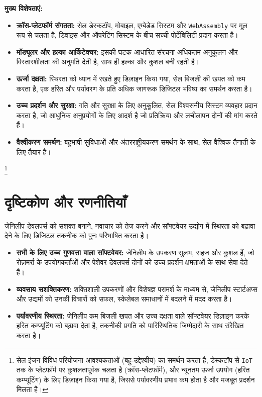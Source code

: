 \documentclass[a4paper,12pt,openany]{book}
\begin{document}
\textbf{मुख्य विशेषताएं:}
\begin{itemize}
    \item \textbf{क्रॉस-प्लेटफॉर्म संगतता:} सेल डेस्कटॉप, मोबाइल, एम्बेडेड सिस्टम और \texttt{WebAssembly} पर मूल रूप से चलता है, डिवाइस और ऑपरेटिंग सिस्टम के बीच सच्ची पोर्टेबिलिटी प्रदान करता है।
    \item \textbf{मॉड्यूलर और हल्का आर्किटेक्चर:} इसकी घटक-आधारित संरचना अधिकतम अनुकूलन और विस्तारशीलता की अनुमति देती है, साथ ही हल्का और कुशल बनी रहती है।
    \item \textbf{ऊर्जा दक्षता:} स्थिरता को ध्यान में रखते हुए डिज़ाइन किया गया, सेल बिजली की खपत को कम करता है, एक हरित और पर्यावरण के प्रति अधिक जागरूक डिजिटल भविष्य का समर्थन करता है।
    \item \textbf{उच्च प्रदर्शन और सुरक्षा:} गति और सुरक्षा के लिए अनुकूलित, सेल विश्वसनीय सिस्टम व्यवहार प्रदान करता है, जो आधुनिक अनुप्रयोगों के लिए आदर्श है जो प्रतिक्रिया और लचीलापन दोनों की मांग करते हैं।
    \item \textbf{वैश्वीकरण समर्थन:} बहुभाषी सुविधाओं और अंतरराष्ट्रीयकरण समर्थन के साथ, सेल वैश्विक तैनाती के लिए तैयार है।
\end{itemize}

\footnote{सेल इंजन विविध परियोजना आवश्यकताओं (बहु-उद्देश्यीय) का समर्थन करता है, डेस्कटॉप से \texttt{IoT} तक के प्लेटफॉर्म पर कुशलतापूर्वक चलता है (क्रॉस-प्लेटफॉर्म), और न्यूनतम ऊर्जा उपयोग (हरित कम्प्यूटिंग) के लिए डिज़ाइन किया गया है, जिससे पर्यावरणीय प्रभाव कम होता है और मजबूत प्रदर्शन मिलता है।}

\chapter{दृष्टिकोण और रणनीतियाँ}

जेनिलीप डेवलपर्स को सशक्त बनाने, नवाचार को तेज करने और सॉफ्टवेयर उद्योग में स्थिरता को बढ़ावा देने के लिए डिजिटल तकनीक को पुनः परिभाषित करता है।

\begin{itemize}
    \item \textbf{सभी के लिए उच्च गुणवत्ता वाला सॉफ्टवेयर:} जेनिलीप के उपकरण सुलभ, सहज और कुशल हैं, जो रोज़मर्रा के उपयोगकर्ताओं और पेशेवर डेवलपर्स दोनों को उच्च प्रदर्शन क्षमताओं के साथ सेवा देते हैं।
    \item \textbf{व्यवसाय सशक्तिकरण:} शक्तिशाली उपकरणों और विशेषज्ञ परामर्श के माध्यम से, जेनिलीप स्टार्टअप्स और उद्यमों को उनकी विचारों को सफल, स्केलेबल समाधानों में बदलने में मदद करता है।
    \item \textbf{पर्यावरणीय स्थिरता:} जेनिलीप कम बिजली खपत और उच्च दक्षता वाले सॉफ्टवेयर डिज़ाइन करके हरित कम्प्यूटिंग को बढ़ावा देता है, तकनीकी प्रगति को पारिस्थितिक जिम्मेदारी के साथ संरेखित करता है।
\end{itemize}
\end{document}

